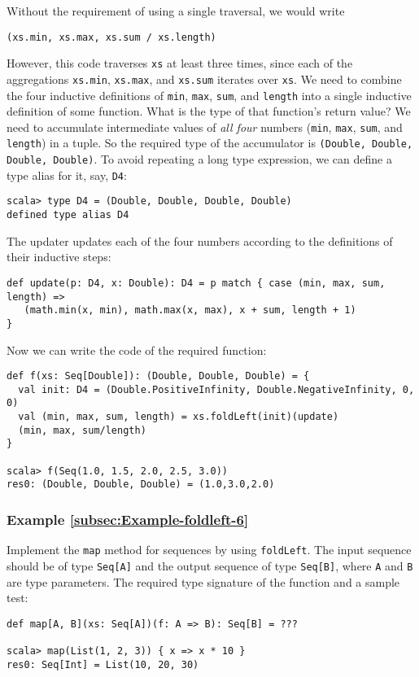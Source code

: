 Without the requirement of using a single traversal, we would write
\begin{lstlisting}
(xs.min, xs.max, xs.sum / xs.length)
\end{lstlisting}
However, this code traverses \lstinline!xs! at least three times,
since each of the aggregations \lstinline!xs.min!, \lstinline!xs.max!,
and \lstinline!xs.sum! iterates over \lstinline!xs!. We need to
combine the four inductive definitions of \lstinline!min!, \lstinline!max!,
\lstinline!sum!, and \lstinline!length! into a single inductive
definition of some function. What is the type of that function\textsf{'}s return
value? We need to accumulate intermediate values of \emph{all four}
numbers (\lstinline!min!, \lstinline!max!, \lstinline!sum!, and
\lstinline!length!) in a tuple. So the required type of the accumulator
is \lstinline!(Double, Double, Double, Double)!. To avoid repeating
a long type expression, we can define a type alias
for it, say, \lstinline!D4!:
\begin{lstlisting}
scala> type D4 = (Double, Double, Double, Double)
defined type alias D4 
\end{lstlisting}
The updater updates each of the four numbers according to the definitions
of their inductive steps:
\begin{lstlisting}
def update(p: D4, x: Double): D4 = p match { case (min, max, sum, length) =>
   (math.min(x, min), math.max(x, max), x + sum, length + 1)
}
\end{lstlisting}
Now we can write the code of the required function:
\begin{lstlisting}
def f(xs: Seq[Double]): (Double, Double, Double) = {
  val init: D4 = (Double.PositiveInfinity, Double.NegativeInfinity, 0, 0)
  val (min, max, sum, length) = xs.foldLeft(init)(update)
  (min, max, sum/length)
}

scala> f(Seq(1.0, 1.5, 2.0, 2.5, 3.0))
res0: (Double, Double, Double) = (1.0,3.0,2.0)
\end{lstlisting}


\subsubsection{Example \label{subsec:Example-foldleft-6}\ref{subsec:Example-foldleft-6}}

Implement the \lstinline!map! method for sequences by using \lstinline!foldLeft!.
The input sequence should be of type \lstinline!Seq[A]! and the output
sequence of type \lstinline!Seq[B]!, where \lstinline!A! and \lstinline!B!
are type parameters. The required type signature of the function and
a sample test:
\begin{lstlisting}
def map[A, B](xs: Seq[A])(f: A => B): Seq[B] = ???

scala> map(List(1, 2, 3)) { x => x * 10 }
res0: Seq[Int] = List(10, 20, 30)
\end{lstlisting}


